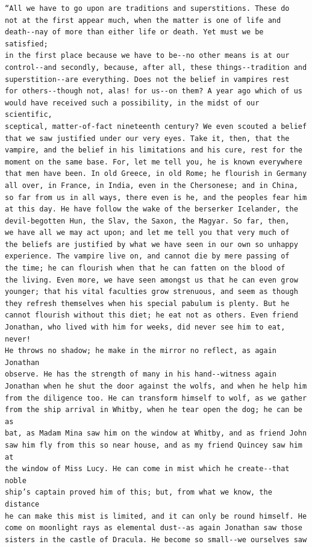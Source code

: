 \documentclass{article}
\begin{document}
\begin{verbatim}
“All we have to go upon are traditions and superstitions. These do
not at the first appear much, when the matter is one of life and
death--nay of more than either life or death. Yet must we be satisfied;
in the first place because we have to be--no other means is at our
control--and secondly, because, after all, these things--tradition and
superstition--are everything. Does not the belief in vampires rest
for others--though not, alas! for us--on them? A year ago which of us
would have received such a possibility, in the midst of our scientific,
sceptical, matter-of-fact nineteenth century? We even scouted a belief
that we saw justified under our very eyes. Take it, then, that the
vampire, and the belief in his limitations and his cure, rest for the
moment on the same base. For, let me tell you, he is known everywhere
that men have been. In old Greece, in old Rome; he flourish in Germany
all over, in France, in India, even in the Chersonese; and in China,
so far from us in all ways, there even is he, and the peoples fear him
at this day. He have follow the wake of the berserker Icelander, the
devil-begotten Hun, the Slav, the Saxon, the Magyar. So far, then,
we have all we may act upon; and let me tell you that very much of
the beliefs are justified by what we have seen in our own so unhappy
experience. The vampire live on, and cannot die by mere passing of
the time; he can flourish when that he can fatten on the blood of
the living. Even more, we have seen amongst us that he can even grow
younger; that his vital faculties grow strenuous, and seem as though
they refresh themselves when his special pabulum is plenty. But he
cannot flourish without this diet; he eat not as others. Even friend
Jonathan, who lived with him for weeks, did never see him to eat, never!
He throws no shadow; he make in the mirror no reflect, as again Jonathan
observe. He has the strength of many in his hand--witness again
Jonathan when he shut the door against the wolfs, and when he help him
from the diligence too. He can transform himself to wolf, as we gather
from the ship arrival in Whitby, when he tear open the dog; he can be as
bat, as Madam Mina saw him on the window at Whitby, and as friend John
saw him fly from this so near house, and as my friend Quincey saw him at
the window of Miss Lucy. He can come in mist which he create--that noble
ship’s captain proved him of this; but, from what we know, the distance
he can make this mist is limited, and it can only be round himself. He
come on moonlight rays as elemental dust--as again Jonathan saw those
sisters in the castle of Dracula. He become so small--we ourselves saw

\end{verbatim}
\end{document}
